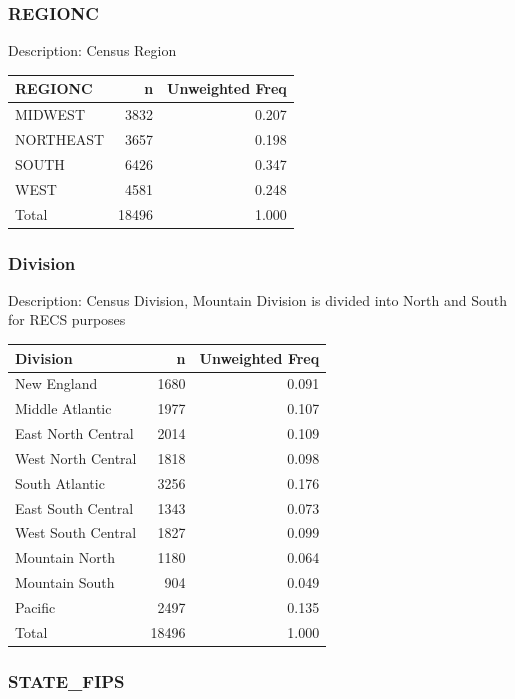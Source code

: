 \documentclass[
]{krantz}
\begin{document}
\hypertarget{regionc}{%
\subsubsection*{REGIONC}\label{regionc}}


Description: Census Region

\begin{tabular}[t]{l|r|r}
\hline
REGIONC & n & Unweighted Freq\\
\hline
MIDWEST & 3832 & 0.207\\
\hline
NORTHEAST & 3657 & 0.198\\
\hline
SOUTH & 6426 & 0.347\\
\hline
WEST & 4581 & 0.248\\
\hline
Total & 18496 & 1.000\\
\hline
\end{tabular}

\hypertarget{division}{%
\subsubsection*{Division}\label{division}}


Description: Census Division, Mountain Division is divided into North and South for RECS purposes

\begin{tabular}[t]{l|r|r}
\hline
Division & n & Unweighted Freq\\
\hline
New England & 1680 & 0.091\\
\hline
Middle Atlantic & 1977 & 0.107\\
\hline
East North Central & 2014 & 0.109\\
\hline
West North Central & 1818 & 0.098\\
\hline
South Atlantic & 3256 & 0.176\\
\hline
East South Central & 1343 & 0.073\\
\hline
West South Central & 1827 & 0.099\\
\hline
Mountain North & 1180 & 0.064\\
\hline
Mountain South & 904 & 0.049\\
\hline
Pacific & 2497 & 0.135\\
\hline
Total & 18496 & 1.000\\
\hline
\end{tabular}

\hypertarget{state_fips}{%
\subsubsection*{STATE\_FIPS}\label{state_fips}}
\end{document}
